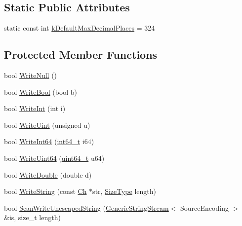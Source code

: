 \subsection*{Static Public Attributes}
\begin{DoxyCompactItemize}
\item 
static const int \mbox{\hyperlink{classrapidjson_1_1_writer_aaf9568d23fcff10e6de27dde77e28547}{k\+Default\+Max\+Decimal\+Places}} = 324
\end{DoxyCompactItemize}
\subsection*{Protected Member Functions}
\begin{DoxyCompactItemize}
\item 
bool \mbox{\hyperlink{classrapidjson_1_1_writer_af8275fa2332a8c7774aa4c8a3655afd5}{Write\+Null}} ()
\item 
bool \mbox{\hyperlink{classrapidjson_1_1_writer_a09c1a50dd2d6de4e8d59e6c8ecf62460}{Write\+Bool}} (bool b)
\item 
bool \mbox{\hyperlink{classrapidjson_1_1_writer_aca40d77c14bf6911c03b5d4b23283e02}{Write\+Int}} (int i)
\item 
bool \mbox{\hyperlink{classrapidjson_1_1_writer_a9255fff8cc9476048f14a1ee7dbd9937}{Write\+Uint}} (unsigned u)
\item 
bool \mbox{\hyperlink{classrapidjson_1_1_writer_aada3d510b7637fd0e9e8b3cbad093c2e}{Write\+Int64}} (\mbox{\hyperlink{stdint_8h_a414156feea104f8f75b4ed9e3121b2f6}{int64\+\_\+t}} i64)
\item 
bool \mbox{\hyperlink{classrapidjson_1_1_writer_a341c2665f6564467dab9787bbbaee2fe}{Write\+Uint64}} (\mbox{\hyperlink{stdint_8h_aec6fcb673ff035718c238c8c9d544c47}{uint64\+\_\+t}} u64)
\item 
bool \mbox{\hyperlink{classrapidjson_1_1_writer_ad8cdd06dfdf1731a2148e859b828979c}{Write\+Double}} (double d)
\item 
bool \mbox{\hyperlink{classrapidjson_1_1_writer_a95860b89f9a9eea9d4336f0023c497ce}{Write\+String}} (const \mbox{\hyperlink{classrapidjson_1_1_writer_a2cf973937ca1110293bf1350fac2a6d6}{Ch}} $\ast$str, \mbox{\hyperlink{namespacerapidjson_a44eb33eaa523e36d466b1ced64b85c84}{Size\+Type}} length)
\item 
bool \mbox{\hyperlink{classrapidjson_1_1_writer_a2d5599f972475793e391559db2de1061}{Scan\+Write\+Unescaped\+String}} (\mbox{\hyperlink{structrapidjson_1_1_generic_string_stream}{Generic\+String\+Stream}}$<$ Source\+Encoding $>$ \&is, size\+\_\+t length)

\end{DoxyCompactItemize}
